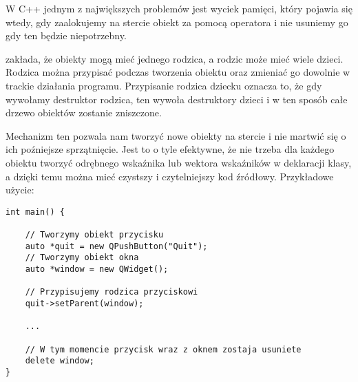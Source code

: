 
\par
W C++ jednym z największych problemów jest wyciek pamięci, który pojawia się wtedy, gdy zaalokujemy na stercie obiekt za pomocą operatora  i nie usuniemy go gdy ten będzie niepotrzebny.
\par
{} zakłada, że obiekty mogą mieć jednego rodzica, a rodzic może mieć wiele dzieci.
Rodzica można przypisać podczas tworzenia obiektu oraz zmieniać go dowolnie w trackie działania programu.
Przypisanie rodzica dziecku oznacza to, że gdy wywołamy destruktor rodzica, ten wywoła destruktory dzieci i w ten sposób całe drzewo obiektów zostanie zniszczone.
\par
Mechanizm ten pozwala nam tworzyć nowe obiekty na stercie i nie martwić się o ich poźniejsze sprzątnięcie.
Jest to o tyle efektywne, że nie trzeba dla każdego obiektu tworzyć odrębnego wskaźnika lub wektora wskaźników w deklaracji klasy, a dzięki temu można mieć czystszy i czytelniejszy kod źródłowy.
Przykładowe użycie:
\par
\begin{lstlisting}
int main() {

    // Tworzymy obiekt przycisku
    auto *quit = new QPushButton("Quit");
    // Tworzymy obiekt okna
    auto *window = new QWidget();

    // Przypisujemy rodzica przyciskowi
    quit->setParent(window);
    
    ...

    // W tym momencie przycisk wraz z oknem zostaja usuniete
    delete window;
}
\end{lstlisting}